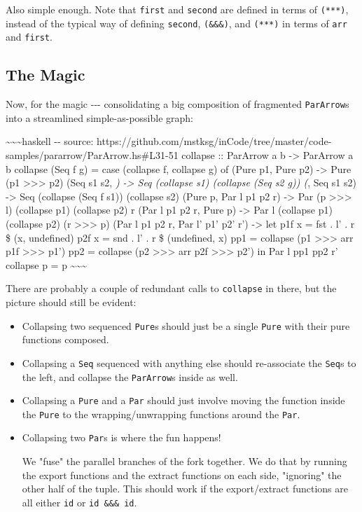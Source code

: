 \documentclass[]{article}
\begin{document}
Also simple enough. Note that \texttt{first} and \texttt{second} are defined in
terms of \texttt{(***)}, instead of the typical way of defining \texttt{second},
\texttt{(\&\&\&)}, and \texttt{(***)} in terms of \texttt{arr} and
\texttt{first}.

\subsection{The Magic}

Now, for the magic -\/-\/- consolidating a big composition of fragmented
\texttt{ParArrow}s into a streamlined simple-as-possible graph:

\textasciitilde{}\textasciitilde{}\textasciitilde{}haskell -\/- source:
https://github.com/mstksg/inCode/tree/master/code-samples/pararrow/ParArrow.hs\#L31-51
collapse :: ParArrow a b -\textgreater{} ParArrow a b collapse (Seq f g) = case
(collapse f, collapse g) of (Pure p1, Pure p2) -\textgreater{} Pure (p1
\textgreater{}\textgreater{}\textgreater{} p2) (Seq s1 s2, \emph{)
-\textgreater{} Seq (collapse s1) (collapse (Seq s2 g)) (}, Seq s1 s2)
-\textgreater{} Seq (collapse (Seq f s1)) (collapse s2) (Pure p, Par l p1 p2 r)
-\textgreater{} Par (p \textgreater{}\textgreater{}\textgreater{} l) (collapse
p1) (collapse p2) r (Par l p1 p2 r, Pure p) -\textgreater{} Par l (collapse p1)
(collapse p2) (r \textgreater{}\textgreater{}\textgreater{} p) (Par l p1 p2 r,
Par l' p1' p2' r') -\textgreater{} let p1f x = fst . l' . r \$ (x, undefined)
p2f x = snd . l' . r \$ (undefined, x) pp1 = collapse (p1
\textgreater{}\textgreater{}\textgreater{} arr p1f
\textgreater{}\textgreater{}\textgreater{} p1') pp2 = collapse (p2
\textgreater{}\textgreater{}\textgreater{} arr p2f
\textgreater{}\textgreater{}\textgreater{} p2') in Par l pp1 pp2 r' collapse p =
p \textasciitilde{}\textasciitilde{}\textasciitilde{}

There are probably a couple of redundant calls to \texttt{collapse} in there,
but the picture should still be evident:

\begin{itemize}
\item
  Collapsing two sequenced \texttt{Pure}s should just be a single \texttt{Pure}
  with their pure functions composed.
\item
  Collapsing a \texttt{Seq} sequenced with anything else should re-associate the
  \texttt{Seq}s to the left, and collapse the \texttt{ParArrow}s inside as well.
\item
  Collapsing a \texttt{Pure} and a \texttt{Par} should just involve moving the
  function inside the \texttt{Pure} to the wrapping/unwrapping functions around
  the \texttt{Par}.
\item
  Collapsing two \texttt{Par}s is where the fun happens!

  We "fuse" the parallel branches of the fork together. We do that by running
  the export functions and the extract functions on each side, "ignoring" the
  other half of the tuple. This should work if the export/extract functions are
  all either \texttt{id} or \texttt{id\ \&\&\&\ id}.
\end{itemize}
\end{document}
